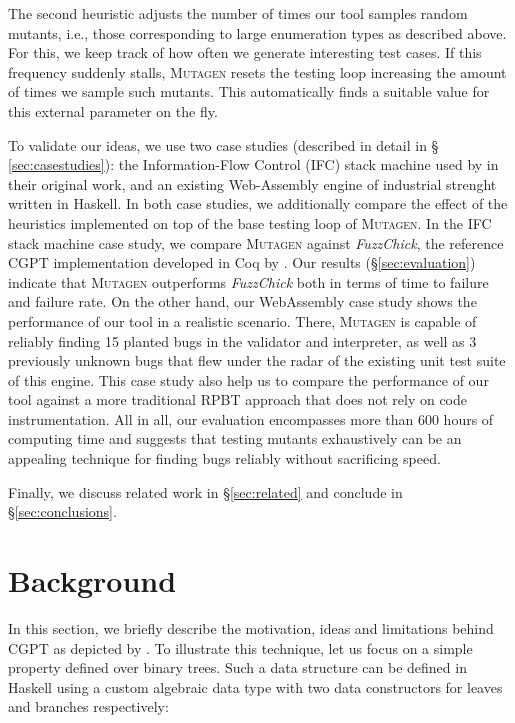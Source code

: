 \documentclass[sigconf, anonymous, review]{acmart}
\newcommand{\fuzzchick}{\textit{FuzzChick}\xspace}
\newcommand{\mutagen}{\textsc{Mutagen}\xspace}
\begin{document}
The second heuristic adjusts the number of times our tool samples random
mutants, i.e., those corresponding to large enumeration types as described
above.
%
For this, we keep track of how often we generate interesting test cases.
%
If this frequency suddenly stalls, \mutagen resets the testing loop increasing
the amount of times we sample such mutants.
%
This automatically finds a suitable value for this external parameter on the
fly.


To validate our ideas, we use two case studies (described in detail in \S
\ref{sec:casestudies}): the Information-Flow Control (IFC) stack machine used by
\citeauthor{lampropoulos2019coverage} in their original work, and an existing
{Web-Assembly} engine of industrial strenght written in Haskell.
%
In both case studies, we additionally compare the effect of the heuristics
implemented on top of the base testing loop of \mutagen.
%
In the IFC stack machine case study, we compare \mutagen against \fuzzchick, the
reference CGPT implementation developed in Coq by
\citeauthor{lampropoulos2019coverage}.
%
Our results (\S \ref{sec:evaluation}) indicate that \mutagen outperforms
\fuzzchick both in terms of time to failure and failure rate.
%
On the other hand, our WebAssembly case study shows the performance of our tool
in a realistic scenario.
%
There, \mutagen is capable of reliably finding 15 planted bugs in the validator
and interpreter, as well as 3 previously unknown bugs that flew under the radar
of the existing unit test suite of this engine.
%
This case study also help us to compare the performance of our tool against a
more traditional RPBT approach that does not rely on code instrumentation.
%
All in all, our evaluation encompasses more than 600 hours of computing time and
suggests that testing mutants exhaustively can be an appealing technique for
finding bugs reliably without sacrificing speed.

Finally, we discuss related work in \S \ref{sec:related} and conclude
in \S \ref{sec:conclusions}.



\section{Background}
\label{sec:background}

In this section, we briefly describe the motivation, ideas and limitations
behind CGPT as depicted by \citeauthor{lampropoulos2019coverage}.
%
To illustrate this technique, let us focus on a simple property defined over
binary trees.
%
Such a data structure can be defined in Haskell using a custom algebraic data
type with two data constructors for leaves and branches respectively:
\end{document}
